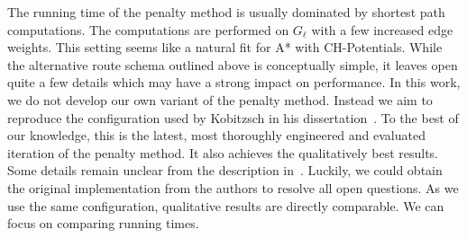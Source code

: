 \documentclass[manuscript,review]{acmart}
\begin{document}
The running time of the penalty method is usually dominated by shortest path computations.
The computations are performed on $G_{\ell}$ with a few increased edge weights.
This setting seems like a natural fit for A* with CH-Potentials.
While the alternative route schema outlined above is conceptually simple, it leaves open quite a few details which may have a strong impact on performance.
In this work, we do not develop our own variant of the penalty method.
Instead we aim to reproduce the configuration used by Kobitzsch in his dissertation~\cite{kobitzsch2015alternative}.
To the best of our knowledge, this is the latest, most thoroughly engineered and evaluated iteration of the penalty method.
It also achieves the qualitatively best results.
Some details remain unclear from the description in~\cite{kobitzsch2015alternative}.
Luckily, we could obtain the original implementation from the authors to resolve all open questions.
As we use the same configuration, qualitative results are directly comparable.
We can focus on comparing running times.
\end{document}
